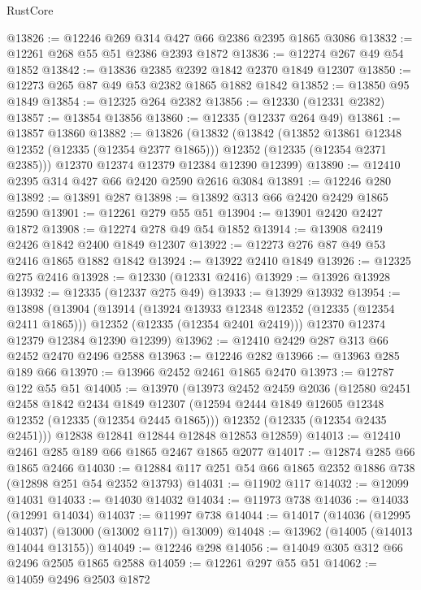 \begin{lexlean}{RustCore}
\begin{coremodule}
@13826 := @12246 @269 @314 @427 @66 @2386 @2395 @1865 @3086
@13832 := @12261 @268 @55 @51 @2386 @2393 @1872
@13836 := @12274 @267 @49 @54 @1852
@13842 := @13836 @2385 @2392 @1842 @2370 @1849 @12307
@13850 := @12273 @265 @87 @49 @53 @2382 @1865 @1882 @1842
@13852 := @13850 @95 @1849
@13854 := @12325 @264 @2382
@13856 := @12330 (@12331 @2382)
@13857 := @13854 @13856
@13860 := @12335 (@12337 @264 @49)
@13861 := @13857 @13860
@13882 := @13826
    (@13832
      (@13842
        (@13852 @13861 @12348 @12352 (@12335 (@12354 @2377 @1865)))
        @12352
        (@12335 (@12354 @2371 @2385)))
      @12370
      @12374
      @12379
      @12384
      @12390
      @12399)
@13890 := @12410 @2395 @314 @427 @66 @2420 @2590 @2616 @3084
@13891 := @12246 @280
@13892 := @13891 @287
@13898 := @13892 @313 @66 @2420 @2429 @1865 @2590
@13901 := @12261 @279 @55 @51
@13904 := @13901 @2420 @2427 @1872
@13908 := @12274 @278 @49 @54 @1852
@13914 := @13908 @2419 @2426 @1842 @2400 @1849 @12307
@13922 := @12273 @276 @87 @49 @53 @2416 @1865 @1882 @1842
@13924 := @13922 @2410 @1849
@13926 := @12325 @275 @2416
@13928 := @12330 (@12331 @2416)
@13929 := @13926 @13928
@13932 := @12335 (@12337 @275 @49)
@13933 := @13929 @13932
@13954 := @13898
    (@13904
      (@13914
        (@13924 @13933 @12348 @12352 (@12335 (@12354 @2411 @1865)))
        @12352
        (@12335 (@12354 @2401 @2419)))
      @12370
      @12374
      @12379
      @12384
      @12390
      @12399)
@13962 := @12410 @2429 @287 @313 @66 @2452 @2470 @2496 @2588
@13963 := @12246 @282
@13966 := @13963 @285 @189 @66
@13970 := @13966 @2452 @2461 @1865 @2470
@13973 := @12787 @122 @55 @51
@14005 := @13970
    (@13973
      @2452
      @2459
      @2036
      (@12580
        @2451
        @2458
        @1842
        @2434
        @1849
        @12307
        (@12594 @2444 @1849 @12605 @12348 @12352 (@12335 (@12354 @2445 @1865)))
        @12352
        (@12335 (@12354 @2435 @2451)))
      @12838
      @12841
      @12844
      @12848
      @12853
      @12859)
@14013 := @12410 @2461 @285 @189 @66 @1865 @2467 @1865 @2077
@14017 := @12874 @285 @66 @1865 @2466
@14030 := @12884 @117 @251 @54 @66 @1865 @2352 @1886 @738 (@12898 @251 @54 @2352 @13793)
@14031 := @11902 @117
@14032 := @12099 @14031
@14033 := @14030 @14032
@14034 := @11973 @738
@14036 := @14033 (@12991 @14034)
@14037 := @11997 @738
@14044 := @14017 (@14036 (@12995 @14037) (@13000 (@13002 @117)) @13009)
@14048 := @13962 (@14005 (@14013 @14044 @13155))
@14049 := @12246 @298
@14056 := @14049 @305 @312 @66 @2496 @2505 @1865 @2588
@14059 := @12261 @297 @55 @51
@14062 := @14059 @2496 @2503 @1872

\end{coremodule}
\end{lexlean}
